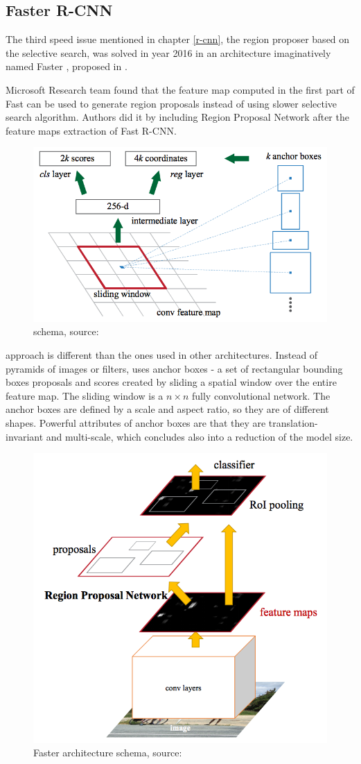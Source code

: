 \subsection{Faster R-CNN}
\label{faster-rcnn}

The third speed issue mentioned in chapter \ref{r-cnn}, the region proposer 
based on the selective search, was solved in year 2016 in an architecture 
imaginatively named Faster , proposed in \cite{faster-rcnn}.

Microsoft Research team found that the feature map computed in the first part of 
Fast  can be used to generate region proposals instead of using slower 
selective search algorithm. Authors did it by including Region Proposal 
Network  after the feature maps extraction of Fast R-CNN.

\begin{figure}[H]
   \centering
	\includegraphics[width=.5\linewidth]{./pictures/fasterrcnn-anchors.png}
	\caption[Region proposal network]{ schema, source: \cite{faster-rcnn}}
      \label{fig:rpn}
\end{figure}

 approach is different than the ones used in other architectures. 
Instead of pyramids of images or filters,  uses anchor boxes - a set of 
rectangular bounding boxes proposals and scores created by sliding a spatial 
window over the entire feature map. The sliding window is a $n \times n$ fully 
convolutional network. The anchor boxes are defined by a scale and aspect ratio, 
so they are of different shapes. Powerful attributes of anchor boxes are that 
they are translation-invariant and multi-scale, which concludes also into a 
reduction of the model size.

\begin{figure}[H]
   \centering
	\includegraphics[width=.55\linewidth]{./pictures/fasterrcnn.png}
	\caption[Faster R-CNN architecture]{Faster  architecture schema, 
source: \cite{faster-rcnn}}
      \label{fig:faster-rcnn}
\end{figure}


